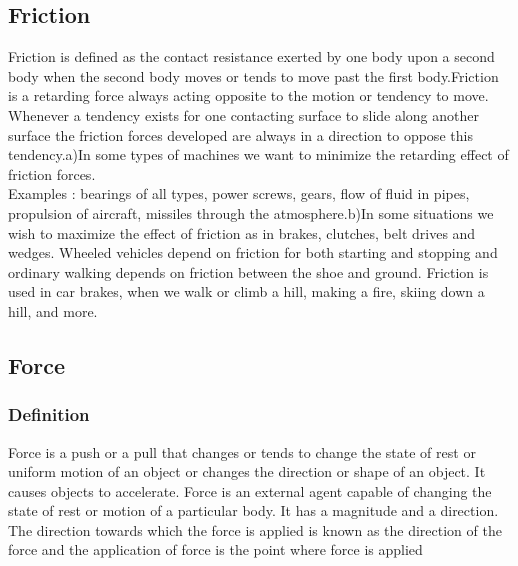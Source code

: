 \documentclass[11pt]{article}
\begin{document}
\subsection{Friction}
Friction is defined as the contact resistance exerted by one body upon a second body
when the second body moves or tends to move past the first body.Friction is a retarding
force always acting opposite to the motion or tendency to move.\\

Whenever a tendency exists for one contacting surface to slide along another surface the friction forces
developed are always in a direction to oppose this tendency.a)In some types of machines
we want to minimize the retarding effect of friction forces.\\

Examples : bearings of all
types, power screws, gears, flow of fluid in pipes, propulsion of aircraft, missiles through
the atmosphere.b)In some situations we wish to maximize the effect of friction as in
brakes, clutches, belt drives and wedges. Wheeled vehicles depend on friction for both
starting and stopping and ordinary walking depends on friction between the shoe and
ground.
Friction is used in car brakes, when we walk or climb a hill, making a fire, skiing down a
hill, and more.
\subsection{Force}
\subsubsection{Definition}
Force is a push or a pull that changes or tends to change the state of rest or uniform
motion of an object or changes the direction or shape of an object. It causes objects to
accelerate. Force is an external agent capable of changing the state of rest or motion of a
particular body. It has a magnitude and a direction. The direction towards which the force
is applied is known as the direction of the force and the application of force is the point
where force is applied
\end{document}
